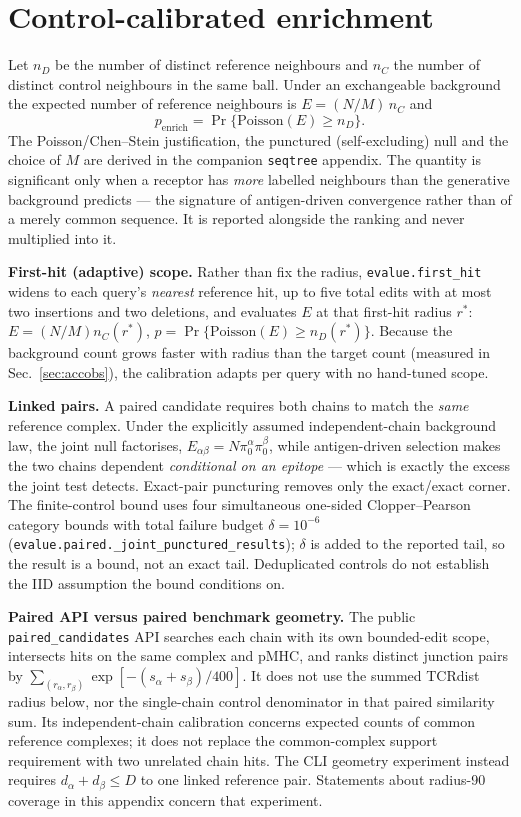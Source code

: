 \documentclass[10pt,a4paper]{article}
\theoremstyle{definition}
\newcommand{\code}[1]{\texttt{\small #1}}
\begin{document}
\section{Control-calibrated enrichment}
Let $n_D$ be the number of distinct reference neighbours and $n_C$ the number of distinct control
neighbours in the same ball. Under an exchangeable background the expected number of reference
neighbours is $E=(N/M)\,n_C$ and
\[
p_{\mathrm{enrich}}=\Pr\{\mathrm{Poisson}(E)\ge n_D\}.
\]
The Poisson/Chen--Stein justification, the punctured (self-excluding) null and the choice of $M$ are
derived in the companion \texttt{seqtree} appendix. The quantity is significant only when a receptor
has \emph{more} labelled neighbours than the generative background predicts --- the signature of
antigen-driven convergence rather than of a merely common sequence. It is reported alongside the
ranking and never multiplied into it.

\textbf{First-hit (adaptive) scope.} Rather than fix the radius, \code{evalue.first\_hit} widens to
each query's \emph{nearest} reference hit, up to five total edits with at most two insertions and
two deletions, and evaluates $E$ at that first-hit radius $r^\ast$: $E=(N/M)n_C(r^\ast)$,
$p=\Pr\{\mathrm{Poisson}(E)\ge n_D(r^\ast)\}$. Because the background count grows faster with radius
than the target count (measured in Sec.~\ref{sec:accobs}), the calibration adapts per query with no
hand-tuned scope.

\textbf{Linked pairs.} A paired candidate requires both chains to match the \emph{same} reference
complex. Under the explicitly assumed independent-chain background law, the joint
null factorises, $E_{\alpha\beta}=N\pi_0^\alpha\pi_0^\beta$, while antigen-driven selection makes
the two chains dependent \emph{conditional on an epitope} --- which is exactly the excess the joint
test detects. Exact-pair puncturing removes only the exact/exact corner. The finite-control bound
uses four simultaneous one-sided Clopper--Pearson category bounds with total failure budget
$\delta=10^{-6}$ (\code{evalue.paired.\_joint\_punctured\_results}); $\delta$ is added to the
reported tail, so the result is a bound, not an exact tail. Deduplicated controls do not establish
the IID assumption the bound conditions on.

\textbf{Paired API versus paired benchmark geometry.} The public \code{paired\_candidates}
API searches each chain with its own bounded-edit scope, intersects hits on the same complex and
pMHC, and ranks distinct junction pairs by
$\sum_{(r_\alpha,r_\beta)}\exp[-(s_\alpha+s_\beta)/400]$.
It does not use the summed TCRdist radius below, nor the single-chain control denominator in that
paired similarity sum. Its independent-chain calibration concerns expected counts of common
reference complexes; it does not replace the common-complex support requirement with two unrelated
chain hits. The CLI geometry experiment instead requires $d_\alpha+d_\beta\le D$ to one linked
reference pair. Statements about radius-90 coverage in this appendix concern that experiment.
\end{document}
